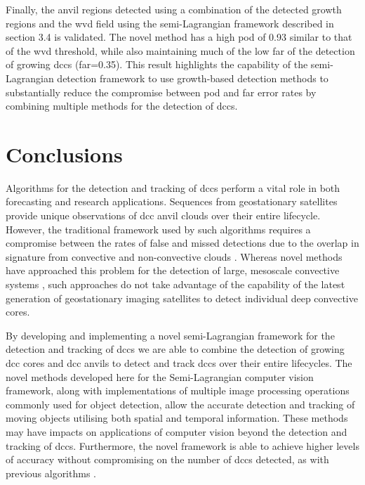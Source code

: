 Finally, the anvil regions detected using a combination of the detected growth regions and the \acrshort{wvd} field using the semi-Lagrangian framework described in section 3.4 is validated.
The novel method has a high \acrshort{pod} of 0.93 similar to that of the \acrshort{wvd} threshold, while also maintaining much of the low \acrshort{far} of the detection of growing \acrshort{dcc}s (\acrshort{far}=0.35).
This result highlights the capability of the semi-Lagrangian detection framework to use growth-based detection methods to substantially reduce the compromise between \acrshort{pod} and \acrshort{far} error rates by combining multiple methods for the detection of \acrshort{dcc}s.


\section{Conclusions}  %

Algorithms for the detection and tracking of \acrshort{dcc}s perform a vital role in both forecasting and research applications.
Sequences from geostationary satellites provide unique observations of \acrshort{dcc} anvil clouds over their entire lifecycle.
However, the traditional framework used by such algorithms requires a compromise between the rates of false and missed detections due to the overlap in signature from convective and non-convective clouds \citep{konduru_new_2013}.
Whereas novel methods have approached this problem for the detection of large, mesoscale convective systems \citep{fiolleau_algorithm_2013}, such approaches do not take advantage of the capability of the latest generation of geostationary imaging satellites to detect individual deep convective cores.

By developing and implementing a novel semi-Lagrangian framework for the detection and tracking of \acrshort{dcc}s we are able to combine the detection of growing \acrshort{dcc} cores \citep{zinner_cb-tram:_2008} and \acrshort{dcc} anvils \citep{muller_role_2018} to detect and track \acrshort{dcc}s over their entire lifecycles.
The novel methods developed here for the Semi-Lagrangian computer vision framework, along with implementations of multiple image processing operations commonly used for object detection, allow the accurate detection and tracking of moving objects utilising both spatial and temporal information.
These methods may have impacts on applications of computer vision beyond the detection and tracking of \acrshort{dcc}s.
Furthermore, the novel framework is able to achieve higher levels of accuracy without compromising on the number of \acrshort{dcc}s detected, as with previous algorithms \citep{muller_novel_2019}.

